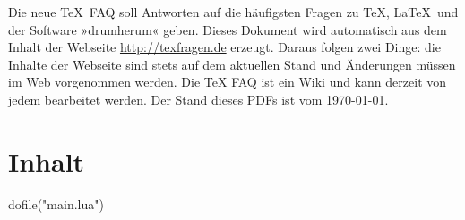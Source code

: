 \documentclass[a4paper,ngerman,fontsize=10bp]{scrartcl}
\begin{document}
\RaggedRight

Die neue \TeX\ FAQ soll Antworten auf die häufigsten Fragen zu \TeX, \LaTeX\ und der Software »drumherum« geben. Dieses Dokument wird automatisch aus dem Inhalt der Webseite \url{http://texfragen.de} erzeugt. Daraus folgen zwei Dinge: die Inhalte der Webseite sind stets auf dem aktuellen Stand und Änderungen müssen im Web vorgenommen werden. Die TeX FAQ ist ein Wiki und kann derzeit von jedem bearbeitet werden. Der Stand dieses PDFs ist vom \today.

\section{Inhalt}
\begin{luacode*}
dofile("main.lua")
\end{luacode*}
\end{document}
